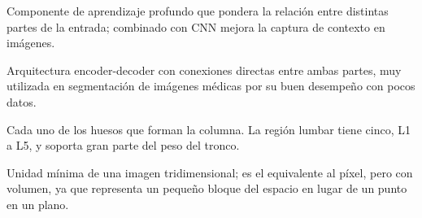 \begin{description}[leftmargin=3.8cm, style=nextline, itemsep=3pt, topsep=3pt]
    \item[Transformer / mecanismo de atención] Componente de aprendizaje profundo que pondera la relación entre distintas partes de la entrada; combinado con CNN mejora la captura de contexto en imágenes.

    \item[U-Net] Arquitectura encoder-decoder con conexiones directas entre ambas partes, muy utilizada en segmentación de imágenes médicas por su buen desempeño con pocos datos.

    \item[Vértebra] Cada uno de los huesos que forman la columna. La región lumbar tiene cinco, L1 a L5, y soporta gran parte del peso del tronco.

    \item[Vóxel] Unidad mínima de una imagen tridimensional; es el equivalente al píxel, pero con volumen, ya que representa un pequeño bloque del espacio en lugar de un punto en un plano.

\end{description}
